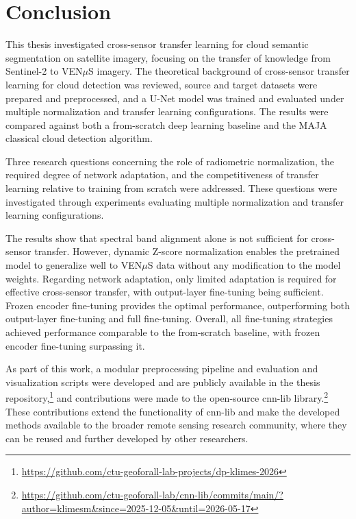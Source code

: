 \chapter{Conclusion} \label{chap:conclusion}

This thesis investigated cross-sensor transfer learning for cloud semantic segmentation on satellite imagery, focusing on the transfer of knowledge from Sentinel-2 to VEN$\mu$S imagery. The theoretical background of cross-sensor transfer learning for cloud detection was reviewed, source and target datasets were prepared and preprocessed, and a U-Net model was trained and evaluated under multiple normalization and transfer learning configurations. The results were compared against both a from-scratch deep learning baseline and the MAJA classical cloud detection algorithm.

Three research questions concerning the role of radiometric normalization, the required degree of network adaptation, and the competitiveness of transfer learning relative to training from scratch were addressed. These questions were investigated through experiments evaluating multiple normalization and transfer learning configurations.

The results show that spectral band alignment alone is not sufficient for cross-sensor transfer. However, dynamic Z-score normalization enables the pretrained model to generalize well to VEN$\mu$S data without any modification to the model weights. Regarding network adaptation, only limited adaptation is required for effective cross-sensor transfer, with output-layer fine-tuning being sufficient. Frozen encoder fine-tuning provides the optimal performance, outperforming both output-layer fine-tuning and full fine-tuning. Overall, all fine-tuning strategies achieved performance comparable to the from-scratch baseline, with frozen encoder fine-tuning surpassing it.

As part of this work, a modular preprocessing pipeline and evaluation and visualization scripts were developed and are publicly available in the thesis repository,\footnote{\url{https://github.com/ctu-geoforall-lab-projects/dp-klimes-2026}} and contributions were made to the open-source cnn-lib library.\footnote{\url{https://github.com/ctu-geoforall-lab/cnn-lib/commits/main/?author=klimesm&since=2025-12-05&until=2026-05-17}} These contributions extend the functionality of cnn-lib and make the developed methods available to the broader remote sensing research community, where they can be reused and further developed by other researchers.

